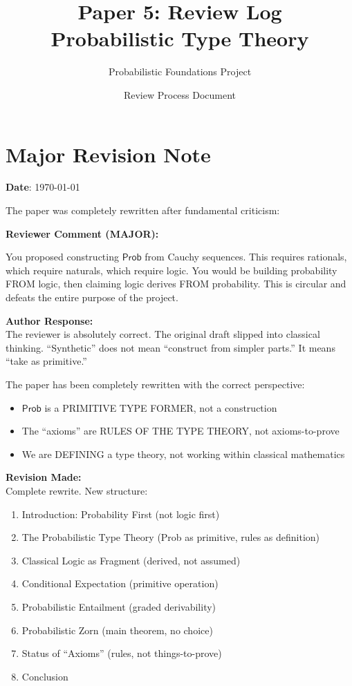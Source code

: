 \documentclass[11pt,a4paper]{article}
\title{Paper 5: Review Log\\[0.5em]
\large Probabilistic Type Theory}
\author{Probabilistic Foundations Project}
\date{Review Process Document}
\newenvironment{review}[1]{%
    \begin{leftbar}
    \textcolor{reviewcolor}{\textbf{Reviewer Comment (#1):}}\\[0.5em]
    \itshape
}{%
    \end{leftbar}
}
\newenvironment{response}{%
    \textcolor{responsecolor}{\textbf{Author Response:}}\\[0.5em]
}{%
    \vspace{1em}
}
\newenvironment{revision}{%
    \textcolor{revisioncolor}{\textbf{Revision Made:}}\\[0.5em]
}{%
    \vspace{1em}
}
\begin{document}
\maketitle

\section*{Major Revision Note}

\textbf{Date}: \today

The paper was completely rewritten after fundamental criticism:

\begin{review}{MAJOR}
You proposed constructing $\mathsf{Prob}$ from Cauchy sequences. This requires rationals, which require naturals, which require logic. You would be building probability FROM logic, then claiming logic derives FROM probability. This is circular and defeats the entire purpose of the project.
\end{review}

\begin{response}
The reviewer is absolutely correct. The original draft slipped into classical thinking. ``Synthetic'' does not mean ``construct from simpler parts.'' It means ``take as primitive.''

The paper has been completely rewritten with the correct perspective:
\begin{itemize}
    \item $\mathsf{Prob}$ is a PRIMITIVE TYPE FORMER, not a construction
    \item The ``axioms'' are RULES OF THE TYPE THEORY, not axioms-to-prove
    \item We are DEFINING a type theory, not working within classical mathematics
\end{itemize}
\end{response}

\begin{revision}
Complete rewrite. New structure:
\begin{enumerate}
    \item Introduction: Probability First (not logic first)
    \item The Probabilistic Type Theory (Prob as primitive, rules as definition)
    \item Classical Logic as Fragment (derived, not assumed)
    \item Conditional Expectation (primitive operation)
    \item Probabilistic Entailment (graded derivability)
    \item Probabilistic Zorn (main theorem, no choice)
    \item Status of ``Axioms'' (rules, not things-to-prove)
    \item Conclusion
\end{enumerate}
\end{revision}
\end{document}
